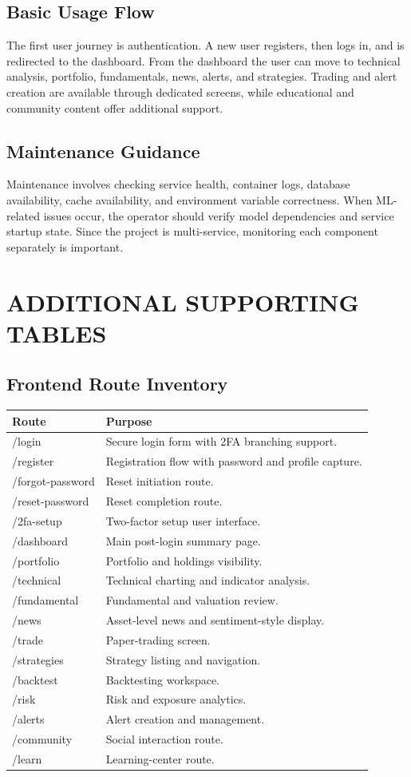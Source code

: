 \documentclass[12pt,a4paper]{report}
\begin{document}
\section{Basic Usage Flow}
The first user journey is authentication. A new user registers, then logs in, and is redirected to the dashboard. From the dashboard the user can move to technical analysis, portfolio, fundamentals, news, alerts, and strategies. Trading and alert creation are available through dedicated screens, while educational and community content offer additional support.

\section{Maintenance Guidance}
Maintenance involves checking service health, container logs, database availability, cache availability, and environment variable correctness. When ML-related issues occur, the operator should verify model dependencies and service startup state. Since the project is multi-service, monitoring each component separately is important.

\chapter{ADDITIONAL SUPPORTING TABLES}
\section{Frontend Route Inventory}
\begin{longtable}{p{} p{}}
\textbf{Route} & \textbf{Purpose} \\
\hline
/login & Secure login form with 2FA branching support. \\
/register & Registration flow with password and profile capture. \\
/forgot-password & Reset initiation route. \\
/reset-password & Reset completion route. \\
/2fa-setup & Two-factor setup user interface. \\
/dashboard & Main post-login summary page. \\
/portfolio & Portfolio and holdings visibility. \\
/technical & Technical charting and indicator analysis. \\
/fundamental & Fundamental and valuation review. \\
/news & Asset-level news and sentiment-style display. \\
/trade & Paper-trading screen. \\
/strategies & Strategy listing and navigation. \\
/backtest & Backtesting workspace. \\
/risk & Risk and exposure analytics. \\
/alerts & Alert creation and management. \\
/community & Social interaction route. \\
/learn & Learning-center route. \\
\end{longtable}
\end{document}
